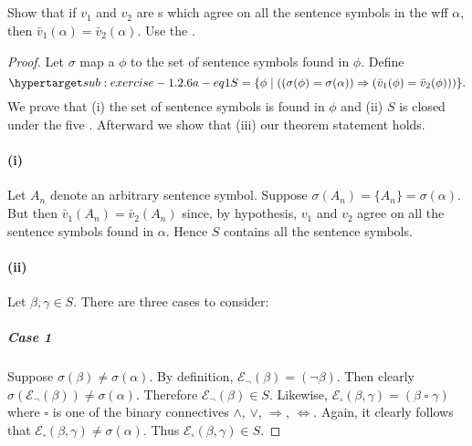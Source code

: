 \documentclass{report}
\begin{document}
\subsection{}%

  Show that if $v_1$ and $v_2$ are s which agree
    on all the sentence symbols in the wff $\alpha$, then
    $\bar{v}_1(\alpha) = \bar{v}_2(\alpha)$.
  Use the .

  \begin{proof}

    Let $\sigma$ map a  $\phi$ to the set of
      sentence symbols found in $\phi$.
    Define
      \begin{equation}
        \hyperlabel{sub:exercise-1.2.6a-eq1}
        S = \{\phi \mid ((\sigma(\phi) = \sigma(\alpha)) \Rightarrow
          (\bar{v}_1(\phi) = \bar{v}_2(\phi)))\}.
      \end{equation}
    We prove that (i) the set of sentence symbols is found in $\phi$ and (ii)
      $S$ is closed under the five .
    Afterward we show that (iii) our theorem statement holds.

    \paragraph{(i)}%

      Let $A_n$ denote an arbitrary sentence symbol.
      Suppose $\sigma(A_n) = \{A_n\} = \sigma(\alpha)$.
      But then $\bar{v}_1(A_n) = \bar{v}_2(A_n)$ since, by hypothesis, $v_1$
        and $v_2$ agree on all the sentence symbols found in $\alpha$.
      Hence $S$ contains all the sentence symbols.

    \paragraph{(ii)}%

      Let $\beta, \gamma \in S$.
      There are three cases to consider:

      \subparagraph{Case 1}%

        Suppose $\sigma(\beta) \neq \sigma(\alpha)$.
        By definition, $\mathcal{E}_{\neg}(\beta) = (\neg\beta)$.
        Then clearly $\sigma(\mathcal{E}_{\neg}(\beta)) \neq \sigma(\alpha)$.
        Therefore $\mathcal{E}_{\neg}(\beta) \in S$.
        Likewise,
          $\mathcal{E}_{\square}(\beta, \gamma) =
            (\beta \mathop{\square} \gamma)$
          where $\square$ is one of the binary connectives $\land$, $\lor$,
            $\Rightarrow$, $\Leftrightarrow$.
        Again, it clearly follows that
          $\mathcal{E}_{\square}(\beta, \gamma) \neq \sigma(\alpha)$.
        Thus $\mathcal{E}_{\square}(\beta, \gamma) \in S$.


\end{proof}
\end{document}

